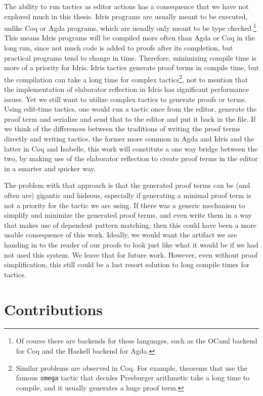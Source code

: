 The ability to run tactics as editor actions has a consequence
that we have not explored much in this thesis.
Idris programs are usually meant to be executed, unlike Coq or
Agda programs, which are usually only meant to be type checked.\footnote{Of
  course there are backends for these languages, such as the OCaml
  backend for Coq and the Haskell backend for Agda.}
This means Idris programs will be compiled more often than Agda or Coq in the long run,
since not much code is added to proofs after its completion, but practical programs tend to change in time. Therefore, minimizing compile time is more of a priority for Idris.
Idris tactics generate proof terms in compile time, but the
compilation can take a long time for complex tactics\footnote{Similar problems
are observed in Coq. For example, theorems that use the famous \texttt{omega}
tactic that decides Presburger arithmetic take a long time to compile, and it
usually generates a huge proof term.},
not to mention that the implementation of elaborator
reflection in Idris has significant performance issues.\cite{leanmeta}
Yet we still want to utilize complex tactics to generate proofs or terms.
Using edit-time tactics, one would run a tactic once from the editor, generate
the proof term and serialize and send that to the editor and put it back in the
file.
If we think of the differences between the traditions of writing the proof
terms directly and writing tactics, the former more common in Agda and Idris
and the latter in Coq and Isabelle, this work will constitute a one way bridge
between the two, by making use of the elaborator reflection to create proof
terms in the editor in a smarter and quicker way.

The problem with that approach is that the generated proof terms can be (and
often are) gigantic and hideous, especially if generating a minimal proof term
is not a priority for the tactic we are using.
If there was a generic mechanism to simplify and minimize the generated proof
terms, and even write them in a way that makes use of dependent pattern
matching, then this could have been a more usable consequence of this work.
Ideally, we would want the artifact we are handing in to the reader of our
proofs to look just like what it would be if we had not used this system.
We leave that for future work.  However, even without proof simplification,
this still could be a last resort solution to long compile times for tactics.

\section{Contributions}

